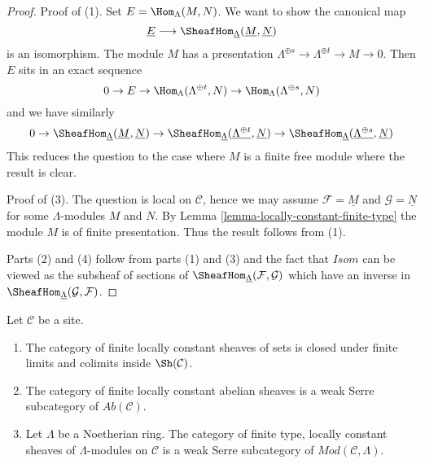 \begin{proof}
Proof of (1). Set $E = \Hom_\Lambda(M, N)$. We want to show the canonical map
$$
\underline{E}
\longrightarrow
\SheafHom_{\underline{\Lambda}}(\underline{M}, \underline{N})
$$
is an isomorphism. The module $M$ has a presentation
$\Lambda^{\oplus s} \to \Lambda^{\oplus t} \to M \to 0$.
Then $E$ sits in an exact sequence
$$
0 \to E \to \Hom_\Lambda(\Lambda^{\oplus t}, N) \to
\Hom_\Lambda(\Lambda^{\oplus s}, N)
$$
and we have similarly
$$
0 \to
\SheafHom_{\underline{\Lambda}}(\underline{M}, \underline{N}) \to
\SheafHom_{\underline{\Lambda}}(\underline{\Lambda^{\oplus t}}, \underline{N})
\to
\SheafHom_{\underline{\Lambda}}(\underline{\Lambda^{\oplus s}}, \underline{N})
$$
This reduces the question to the case where $M$ is a finite free module
where the result is clear.

\medskip\noindent
Proof of (3). The question is local on $\mathcal{C}$, hence we may assume
$\mathcal{F} = \underline{M}$ and $\mathcal{G} = \underline{N}$
for some $\Lambda$-modules $M$ and $N$.
By Lemma \ref{lemma-locally-constant-finite-type}
the module $M$ is of finite presentation. Thus the result follows from (1).

\medskip\noindent
Parts (2) and (4) follow from parts (1) and (3) and the
fact that $\mathit{Isom}$ can be viewed as the subsheaf of sections of
$\SheafHom_{\underline{\Lambda}}(\mathcal{F}, \mathcal{G})$
which have an inverse in
$\SheafHom_{\underline{\Lambda}}(\mathcal{G}, \mathcal{F})$.
\end{proof}

\begin{lemma}
\label{lemma-kernel-finite-locally-constant}
Let $\mathcal{C}$ be a site.
\begin{enumerate}
\item The category of finite locally constant sheaves of sets
is closed under finite limits and colimits inside $\Sh(\mathcal{C})$.
\item The category of finite locally constant abelian sheaves is a
weak Serre subcategory of $\textit{Ab}(\mathcal{C})$.
\item Let $\Lambda$ be a Noetherian ring. The category of
finite type, locally constant sheaves of $\Lambda$-modules on
$\mathcal{C}$ is a weak Serre subcategory of
$\textit{Mod}(\mathcal{C}, \Lambda)$.
\end{enumerate}
\end{lemma}

